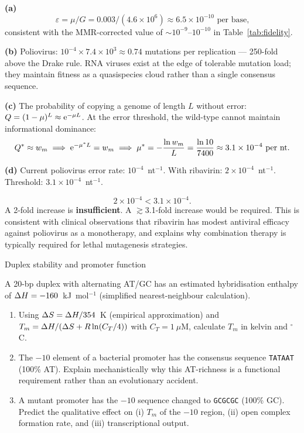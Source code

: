 \documentclass[12pt, a4paper, oneside]{report}
\begin{document}
\begin{solution}
  \textbf{(a)}
  \[
    \varepsilon = \mu / G = 0.003 / (4.6\times10^6) \approx 6.5\times10^{-10}
    \text{ per base,}
  \]
  consistent with the MMR-corrected value of $\sim10^{-9}$--$10^{-10}$
  in Table~\ref{tab:fidelity}.

  \textbf{(b)} Poliovirus: $10^{-4} \times 7.4\times10^3 \approx 0.74$
  mutations per replication — 250-fold above the Drake rule. RNA viruses
  exist at the edge of tolerable mutation load; they maintain fitness
  as a quasispecies cloud rather than a single consensus sequence.

  \textbf{(c)} The probability of copying a genome of length $L$ without
  error: $Q = (1-\mu)^L \approx \mathrm{e}^{-\mu L}$.
  At the error threshold, the wild-type cannot maintain informational
  dominance:
  \[
    Q^* \approx w_m \implies \mathrm{e}^{-\mu^* L} = w_m \implies
    \mu^* = -\frac{\ln w_m}{L} = \frac{\ln 10}{7400} \approx 3.1\times10^{-4}
    \text{ per nt.}
  \]

  \textbf{(d)} Current poliovirus error rate: $10^{-4}$~nt$^{-1}$.
  With ribavirin: $2\times10^{-4}$~nt$^{-1}$.
  Threshold: $3.1\times10^{-4}$~nt$^{-1}$.

  \[
    2\times10^{-4} < 3.1\times10^{-4}.
  \]
  A 2-fold increase is \textbf{insufficient}. A $\gtrsim$3.1-fold increase
  would be required. This is consistent with clinical observations that
  ribavirin has modest antiviral efficacy against poliovirus as a
  monotherapy, and explains why combination therapy is typically required
  for lethal mutagenesis strategies.
\end{solution}

\begin{problem}{\enspace{}\enspace Duplex stability and promoter function}

  A 20-bp duplex with alternating AT/GC has an estimated hybridisation
  enthalpy of $\Delta H = -160$~kJ~mol$^{-1}$ (simplified nearest-neighbour
  calculation).

  \begin{enumerate}
    \item Using $\Delta S = \Delta H / 354$~K (empirical approximation) and
          $T_m = \Delta H / (\Delta S + R\ln(C_T/4))$ with
          $C_T = 1~\mu$M, calculate $T_m$ in kelvin and $^\circ$C.
    \item The $-10$ element of a bacterial promoter has the consensus
          sequence \texttt{TATAAT} (100\% AT). Explain mechanistically
          why this AT-richness is a functional requirement rather than
          an evolutionary accident.
    \item A mutant promoter has the $-10$ sequence changed to
          \texttt{GCGCGC} (100\% GC). Predict the qualitative effect on
          (i) $T_m$ of the $-10$ region, (ii) open complex formation rate,
          and (iii) transcriptional output.
  \end{enumerate}
\end{problem}
\end{document}
